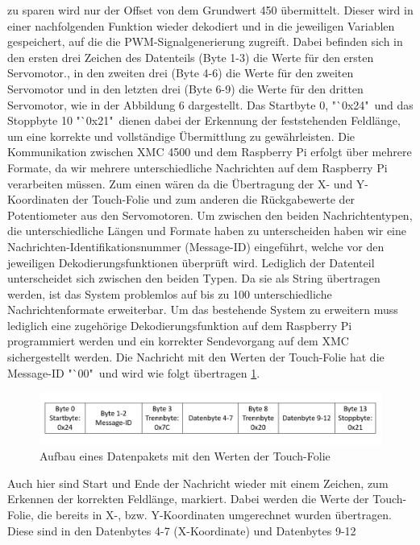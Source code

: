 \documentclass[12pt,a4paper,bibliography=totoc,listof=totoc]{scrartcl}
\begin{document}
zu sparen wird nur der Offset von dem Grundwert 450 übermittelt. Dieser wird in einer nachfolgenden 
Funktion wieder dekodiert und in die jeweiligen Variablen gespeichert, auf die die PWM-Signalgenerierung 
zugreift. Dabei befinden sich in den ersten drei Zeichen des Datenteils (Byte 1-3) die Werte für den ersten 
Servomotor., in den zweiten drei (Byte 4-6) die Werte für den zweiten Servomotor und in den letzten drei 
(Byte 6-9) die Werte für den dritten Servomotor, wie in der Abbildung 6 dargestellt. Das Startbyte 0, 
"`0x24"\, und das Stoppbyte 10 "`0x21"\, dienen dabei der Erkennung der feststehenden Feldlänge, um eine korrekte 
und vollständige Übermittlung zu gewährleisten. Die Kommunikation zwischen XMC 4500 und dem Raspberry Pi 
erfolgt über mehrere Formate, da wir mehrere unterschiedliche Nachrichten auf dem Raspberry Pi verarbeiten 
müssen. Zum einen wären da die Übertragung der X- und Y-Koordinaten der Touch-Folie und zum anderen die 
Rückgabewerte der Potentiometer aus den Servomotoren. Um zwischen den beiden Nachrichtentypen, die 
unterschiedliche Längen und Formate haben zu unterscheiden haben wir eine Nachrichten-Identifikationsnummer 
(Message-ID) eingeführt, welche vor den jeweiligen Dekodierungsfunktionen überprüft wird. Lediglich der 
Datenteil unterscheidet sich zwischen den beiden Typen. Da sie als String übertragen werden, ist das 
System problemlos auf bis zu 100 unterschiedliche Nachrichtenformate erweiterbar. Um das bestehende System 
zu erweitern muss lediglich eine zugehörige Dekodierungsfunktion auf dem Raspberry Pi programmiert werden 
und ein korrekter Sendevorgang auf dem XMC sichergestellt werden. Die Nachricht mit den Werten der 
Touch-Folie hat die Message-ID "`00" \,und wird wie folgt übertragen \ref{fig:UART Platte}.
\begin{figure}[htbp]
	\centering
	\includegraphics[scale = 0.5]{pics/Uartplatte}
	\caption{Aufbau eines Datenpakets mit den Werten der Touch-Folie}
	\label{fig:UART Platte}
\end{figure}
Auch hier sind Start und Ende der Nachricht wieder mit einem Zeichen, zum Erkennen der korrekten 
Feldlänge, markiert. Dabei werden die Werte der Touch-Folie, die bereits in X-, bzw. Y-Koordinaten 
umgerechnet wurden übertragen. Diese sind in den Datenbytes 4-7 (X-Koordinate) und Datenbytes 9-12 
\end{document}
